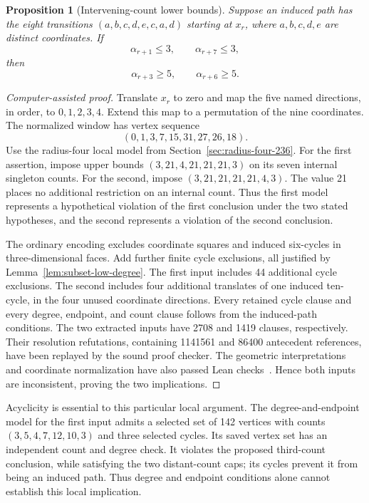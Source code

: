 \documentclass[11pt,a4paper]{article}
\newtheorem{proposition}[theorem]{Proposition}
\theoremstyle{definition}
\theoremstyle{remark}
\begin{document}
\begin{proposition}[Intervening-count lower bounds]\label{prop:intervening-counts}
Suppose an induced path has the eight transitions $(a,b,c,d,e,c,a,d)$ starting at $x_r$, where $a,b,c,d,e$ are distinct coordinates. If
\[
\alpha_{r+1}\le3,\qquad \alpha_{r+7}\le3,
\]
then
\[
\alpha_{r+3}\ge5,\qquad \alpha_{r+6}\ge5.
\]
\end{proposition}
\begin{proof}[Computer-assisted proof]
Translate $x_r$ to zero and map the five named directions, in order, to $0,1,2,3,4$. Extend this map to a permutation of the nine coordinates. The normalized window has vertex sequence
\[
(0,1,3,7,15,31,27,26,18).
\]
Use the radius-four local model from Section~\ref{sec:radius-four-236}. For the first assertion, impose upper bounds $(3,21,4,21,21,21,3)$ on its seven internal singleton counts. For the second, impose $(3,21,21,21,21,4,3)$. The value 21 places no additional restriction on an internal count. Thus the first model represents a hypothetical violation of the first conclusion under the two stated hypotheses, and the second represents a violation of the second conclusion.

The ordinary encoding excludes coordinate squares and induced six-cycles in three-dimensional faces. Add further finite cycle exclusions, all justified by Lemma~\ref{lem:subset-low-degree}. The first input includes 44 additional cycle exclusions. The second includes four additional translates of one induced ten-cycle, in the four unused coordinate directions. Every retained cycle clause and every degree, endpoint, and count clause follows from the induced-path conditions. The two extracted inputs have 2708 and 1419 clauses, respectively. Their resolution refutations, containing 1141561 and 86400 antecedent references, have been replayed by the sound proof checker. The geometric interpretations and coordinate normalization have also passed Lean checks~\cite{interveningarchive}. Hence both inputs are inconsistent, proving the two implications.
\end{proof}

Acyclicity is essential to this particular local argument. The degree-and-endpoint model for the first input admits a selected set of 142 vertices with counts $(3,5,4,7,12,10,3)$ and three selected cycles. Its saved vertex set has an independent count and degree check. It violates the proposed third-count conclusion, while satisfying the two distant-count caps; its cycles prevent it from being an induced path. Thus degree and endpoint conditions alone cannot establish this local implication.
\end{document}
